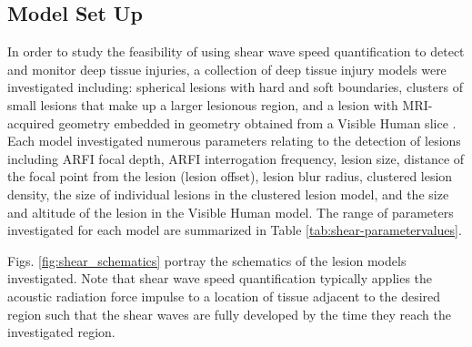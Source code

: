 		\subsection{Model Set Up}
		\label{subsec:model_setup}
			In order to study the feasibility of using shear wave speed quantification to detect and monitor deep tissue injuries, a collection of deep tissue injury models were investigated including: spherical lesions with hard and soft boundaries, clusters of small lesions that make up a larger lesionous region, and a lesion with MRI-acquired geometry \cite{solis13} embedded in geometry obtained from a Visible Human slice \cite{visiblehuman}. Each model investigated numerous parameters relating to the detection of lesions including ARFI focal depth, ARFI interrogation frequency, lesion size, distance of the focal point from the lesion (lesion offset), lesion blur radius, clustered lesion density, the size of individual lesions in the clustered lesion model, and the size and altitude of the lesion in the Visible Human model. The range of parameters investigated for each model are summarized in Table \ref{tab:shear-parametervalues}.

			Figs. \ref{fig:shear_schematics} portray the schematics of the lesion models investigated. Note that shear wave speed quantification typically applies the acoustic radiation force impulse to a location of tissue adjacent to the desired region such that the shear waves are fully developed by the time they reach the investigated region.

